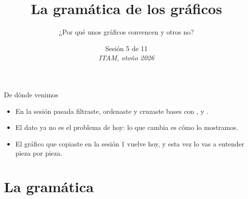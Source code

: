 %



\title[Lab de R · Sesión 5]{La gramática de los gráficos}
\subtitle{¿Por qué unos gráficos convencen y otros no?}
\date{%
  Sesión 5 de 11\\[0.3em]
  \textit{ITAM, otoño 2026}%
}



{
\begin{frame}
  \titlepage
\end{frame}}


\begin{frame}{De dónde venimos}
  \vspace{0.3em}
  \begin{itemize}\setlength{\itemsep}{0.9em}
    \item<1-> En la sesión pasada filtraste, ordenaste y cruzaste bases con
          ,  y .
    \item<2-> El dato ya no es el problema de hoy: lo que cambia es cómo lo
          mostramos.
    \item<3-> El gráfico que copiaste en la sesión 1 vuelve hoy, y esta vez
          lo vas a entender pieza por pieza.
  \end{itemize}
\end{frame}

\section{La gramática}

